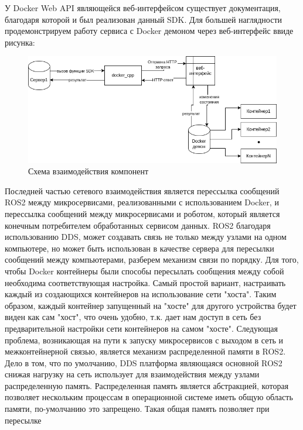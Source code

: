 \documentclass[a4paper, 14pt]{extreport}
\begin{document}
У Docker Web API являющейся веб-интерфейсом существует документация, благодаря которой и был реализован данный SDK. Для большей
наглядности продемонстрируем работу сервиса с Docker демоном через веб-интерфейс ввиде рисунка:
\vspace{5mm}
\begin{figure}[ht]
\begin{center}
\includegraphics[scale = 0.6]{./figure/docker_connect}
\caption{Схема взаимодействия компонент}
\label{fig:manip_photo}
\end{center}
\end{figure}
\par Последней частью сетевого взаимодействия является перессылка сообщений ROS2 между микросервисами, реализованными с использованием
Docker, и перессылка сообщений между микросервисами и роботом, который является конечным потребителем обработанных сервисом данных.
ROS2 благодаря использованию DDS, может создавать связь не только между узлами на одном компьютере, но может быть использован в 
качестве сервера для пересылки сообщений между компьютерами, разберем механизм связи по порядку. Для того, чтобы Docker контейнеры 
были способы пересылать сообщения между собой необходима соответствующая настройка. Самый простой вариант, настраивать каждый из 
создающихся контейнеров на использование сети "хоста". Таким образом, каждый контейнер запущенный на "хосте" для другого устройства 
будет виден как сам "хост", что очень удобно, т.к. дает нам доступ в сеть без предварительной настройки сети контейнеров на самом 
"хосте". Следующая проблема, возникающая на пути к запуску микросервисов с выходом в сеть и межконтейнерной связью, является механизм 
распределенной памяти\cite{sharedMemArt} в ROS2. Дело в том, что по умолчанию, DDS платформа являющаяся основной ROS2 снижая нагрузку на сеть использует 
для взаимодействия между узлами распределенную память. Распределенная память является абстракцией, которая позволяет нескольким 
процессам в операционной системе иметь общую область памяти, по-умолчанию это запрещено. Такая общая память позволяет при пересылке 
\end{document}
